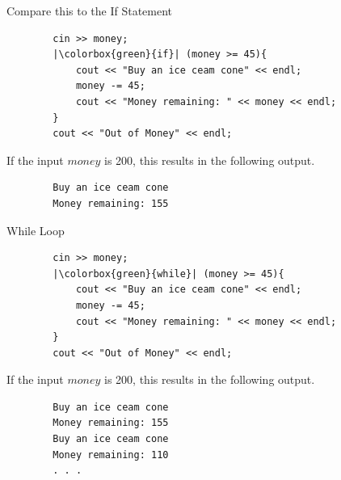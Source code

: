 \begin{frame}[fragile]{Compare this to the If Statement}{}
    \begin{verbatim}
        cin >> money;
        |\colorbox{green}{if}| (money >= 45){
            cout << "Buy an ice ceam cone" << endl;
            money -= 45;
            cout << "Money remaining: " << money << endl;
        }
        cout << "Out of Money" << endl;
    \end{verbatim}
    \begin{block}{If the input $money$ is 200, this results in the following output.}
        \begin{verbatim}
        Buy an ice ceam cone
        Money remaining: 155
        \end{verbatim}
    \end{block}
\end{frame}

\begin{frame}[fragile]{While Loop}{}
    \vspace{2.3em}
    \begin{verbatim}
        cin >> money;
        |\colorbox{green}{while}| (money >= 45){
            cout << "Buy an ice ceam cone" << endl;
            money -= 45;
            cout << "Money remaining: " << money << endl;
        }
        cout << "Out of Money" << endl;
    \end{verbatim}
    \begin{block}{If the input $money$ is 200, this results in the following output.}
        \begin{verbatim}
        Buy an ice ceam cone
        Money remaining: 155
        Buy an ice ceam cone
        Money remaining: 110
        . . .
        \end{verbatim}
    \end{block}
\end{frame}



